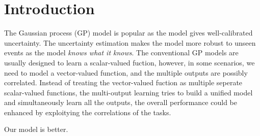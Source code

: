 \section{Introduction}

The Gaussian process (GP) model is popular as the model gives well-calibrated uncertainty. The uncertainty estimation makes the model more robust to unseen events as the model \emph{knows what it knows}. The conventional GP models are usually designed to learn a scalar-valued fuction, however, in some scenarios, we need to model a vector-valued function, and the multiple outputs are possibly correlated. Instead of treating the vector-valued fuction as multiple seperate scalar-valued functions, the multi-output learning\cite{zhang2017survey} tries to build a unified model and simultaneously learn all the outputs, the overall performance could be enhanced by exploitying the correlations of the tasks.



Our model is better.



